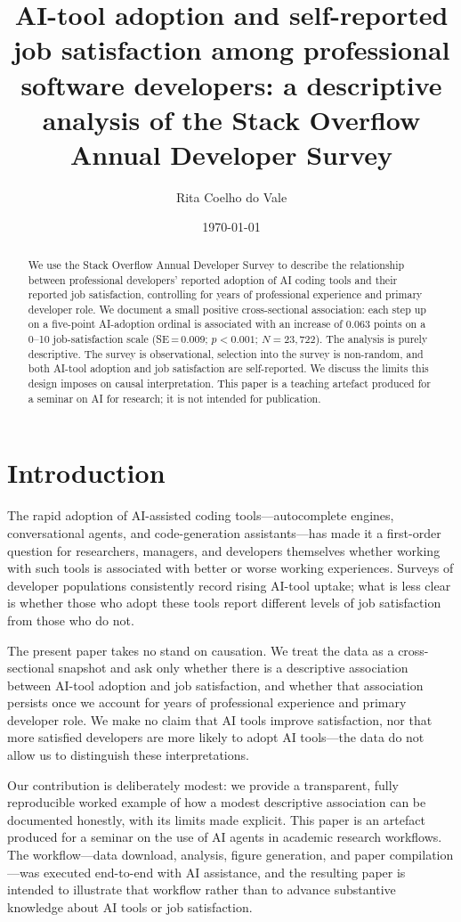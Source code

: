 \documentclass[11pt]{article}
\title{AI-tool adoption and self-reported job satisfaction among professional
software developers: a descriptive analysis of the Stack Overflow Annual
Developer Survey}
\author[1]{Rita Coelho do Vale}
\affil[1]{Universidade Cat\'olica Portuguesa}
\date{\today}
\begin{document}
\maketitle

\begin{abstract}
We use the Stack Overflow Annual Developer Survey \citep{stackoverflow2025survey}
to describe the relationship between professional developers' reported adoption
of AI coding tools and their reported job satisfaction, controlling for years of
professional experience and primary developer role.
We document a small positive cross-sectional association: each step up on a
five-point AI-adoption ordinal is associated with an increase of 0.063 points
on a 0--10 job-satisfaction scale (SE\,=\,0.009; $p < 0.001$; $N = 23{,}722$).
The analysis is purely descriptive.
The survey is observational, selection into the survey is non-random, and both
AI-tool adoption and job satisfaction are self-reported.
We discuss the limits this design imposes on causal interpretation.
This paper is a teaching artefact produced for a seminar on AI for research;
it is not intended for publication.
\end{abstract}

\section{Introduction}

The rapid adoption of AI-assisted coding tools---autocomplete engines,
conversational agents, and code-generation assistants---has made it a
first-order question for researchers, managers, and developers themselves
whether working with such tools is associated with better or worse working
experiences. Surveys of developer populations consistently record rising
AI-tool uptake; what is less clear is whether those who adopt these tools
report different levels of job satisfaction from those who do not.

The present paper takes no stand on causation. We treat the data as a
cross-sectional snapshot and ask only whether there is a descriptive
association between AI-tool adoption and job satisfaction, and whether
that association persists once we account for years of professional
experience and primary developer role. We make no claim that AI tools
improve satisfaction, nor that more satisfied developers are more likely
to adopt AI tools---the data do not allow us to distinguish these
interpretations.

Our contribution is deliberately modest: we provide a transparent, fully
reproducible worked example of how a modest descriptive association can be
documented honestly, with its limits made explicit. This paper is an
artefact produced for a seminar on the use of AI agents in academic
research workflows. The workflow---data download, analysis, figure
generation, and paper compilation---was executed end-to-end with AI
assistance, and the resulting paper is intended to illustrate that
workflow rather than to advance substantive knowledge about AI tools or
job satisfaction.
\end{document}
